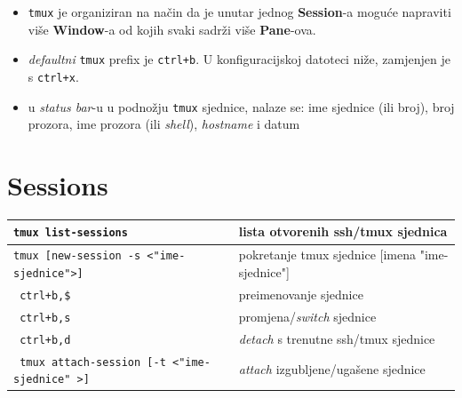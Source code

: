 \documentclass[10pt]{article}
\begin{document}
\renewcommand{\arraystretch}{1.50}

    \begin{itemize}
        \item \texttt{tmux} je organiziran na način da je unutar jednog \textbf{Session}-a moguće napraviti više \textbf{Window}-a od kojih svaki sadrži više \textbf{Pane}-ova.
        \item \textit{defaultni} \texttt{tmux} prefix je \texttt{ctrl+b}. U konfiguracijskoj datoteci niže, zamjenjen je s \texttt{ctrl+x}. 
        \item u \textit{status bar}-u u podnožju \texttt{tmux} sjednice, nalaze se: ime sjednice (ili broj), broj prozora, ime prozora (ili \textit{shell}), \textit{hostname} i datum
    \end{itemize}

    \section*{\color{ForestGreen} Sessions}
    \begin{tabular}{|>{\tt}p{9.00cm}|>{}p{15.50cm}|}
        \hline
        tmux list-sessions                          &   lista otvorenih ssh/tmux sjednica                   \\ \hline
        tmux [new-session -s <"ime-sjednice">]      &   pokretanje tmux sjednice [imena "ime-sjednice"]     \\ \hline
        ctrl+b,\$                                   &   preimenovanje sjednice                              \\ \hline
        ctrl+b,s                                    &   promjena/\textit{switch} sjednice                   \\ \hline
        ctrl+b,d                                    &   \textit{detach} s trenutne ssh/tmux sjednice        \\ \hline
        tmux attach-session [-t <"ime-sjednice" >]  &   \textit{attach} izgubljene/ugašene sjednice         \\ \hline
    \end{tabular}

\end{document}
